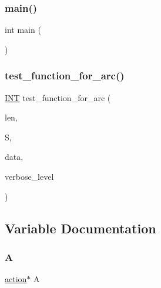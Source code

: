 \mbox{\label{simeon_8_c_ae66f6b31b5ad750f1fe042a706a4e3d4}} 
\subsubsection{\texorpdfstring{main()}{main()}}
{\footnotesize\ttfamily int main (\begin{DoxyParamCaption}\item[{void}]{ }\end{DoxyParamCaption})}

\mbox{\label{simeon_8_c_aea48fbc94e3a6fcfdebca8e2ff571716}} 
\subsubsection{\texorpdfstring{test\+\_\+function\+\_\+for\+\_\+arc()}{test\_function\_for\_arc()}}
{\footnotesize\ttfamily \mbox{\hyperlink{galois_8h_a09fddde158a3a20bd2dcadb609de11dc}{I\+NT}} test\+\_\+function\+\_\+for\+\_\+arc (\begin{DoxyParamCaption}\item[{\mbox{\hyperlink{galois_8h_a09fddde158a3a20bd2dcadb609de11dc}{I\+NT}}}]{len,  }\item[{\mbox{\hyperlink{galois_8h_a09fddde158a3a20bd2dcadb609de11dc}{I\+NT}} $\ast$}]{S,  }\item[{void $\ast$}]{data,  }\item[{\mbox{\hyperlink{galois_8h_a09fddde158a3a20bd2dcadb609de11dc}{I\+NT}}}]{verbose\+\_\+level }\end{DoxyParamCaption})}



\subsection{Variable Documentation}
\mbox{\label{simeon_8_c_a97833f04c3a9c008df5521a2fc291bb4}} 
\subsubsection{\texorpdfstring{A}{A}}
{\footnotesize\ttfamily \mbox{\hyperlink{classaction}{action}}$\ast$ A}

